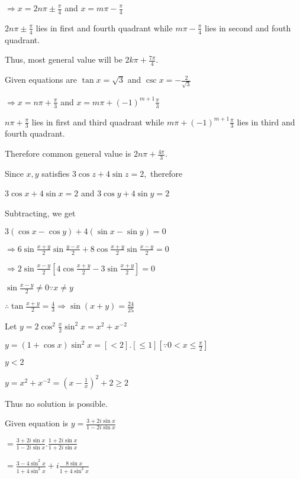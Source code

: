   $\Rightarrow x = 2n\pi \pm \frac{\pi}{4}$ and $x = m\pi - \frac{\pi}{4}$

  $2n\pi \pm \frac{\pi}{4}$ lies in first and fourth quadrant while $m\pi - \frac{\pi}{4}$ lies in second and fouth
  quadrant.

  Thus, most general value will be $2k\pi + \frac{7\pi}{4}.$

\item Given equations are $\tan x = \sqrt{3}$ and $\csc x = -\frac{2}{\sqrt{3}}$

  $\Rightarrow x = n\pi + \frac{\pi}{3}$ and $x = m\pi + (-1)^{m + 1}\frac{\pi}{3}$

  $n\pi + \frac{\pi}{3}$ lies in first and third quadrant while $m\pi + (-1)^{m + 1}\frac{\pi}{3}$ lies in third and
  fourth quadrant.

  Therefore common general value is $2n\pi + \frac{4\pi}{3}.$

\item Since $x, y$ satisfies $3\cos z + 4\sin z = 2,$ therefore

  $3\cos x + 4\sin x = 2$ and $3\cos y + 4\sin y = 2$

  Subtracting, we get

  $3(\cos x - \cos y) + 4(\sin x - \sin y) = 0$

  $\Rightarrow 6\sin\frac{x + y}{2}\sin\frac{y - x}{2} + 8\cos\frac{x + y}{2}\sin\frac{x - y}{2} = 0$

  $\Rightarrow 2\sin\frac{x - y}{2}\left[4\cos\frac{x + y}{2} - 3\sin\frac{x + y}{2}\right] = 0$

  $\sin\frac{x - y}{2}\neq 0 \because x\neq y$

  $\therefore \tan\frac{x + y}{2}  = \frac{4}{3} \Rightarrow \sin(x + y) = \frac{24}{25}$

\item Let $y = 2\cos^2\frac{x}{2}\sin^2x = x^2+ x^{-2}$

  $y = (1 + \cos x)\sin^2x = [< 2].[\leq 1] [\because 0<x\leq \frac{\pi}{2}]$

  $y < 2$

  $y = x^2 + x^{-2} = \left(x - \frac{1}{x}\right)^2 + 2\geq 2$

  Thus no solution is possible.

\item Given equation is $y = \frac{3 + 2i\sin x}{1 - 2i\sin x}$

  $= \frac{3 + 2i\sin x}{1 - 2i\sin x}.\frac{1 + 2i\sin x}{1 + 2i\sin x}$

  $= \frac{3 - 4\sin^2x}{1 + 4\sin^2x} + i\frac{8\sin x}{1 + 4\sin^2x}$

